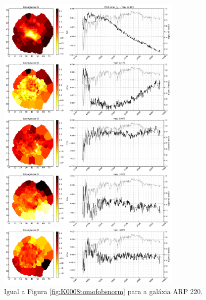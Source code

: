 \begin{figure}
    \includegraphics[width=0.8\textwidth]{figuras/K0802-tomo-obs-norm.pdf}
    \caption[Tomogramas de 1 a 5 para o cubo $f_{obs}$ - ARP 220.]
    {Igual a Figura \ref{fig:K0008tomofobsnorm} para a galáxia ARP 220.}
    \label{fig:K0802tomofobsnorm}
\end{figure}

